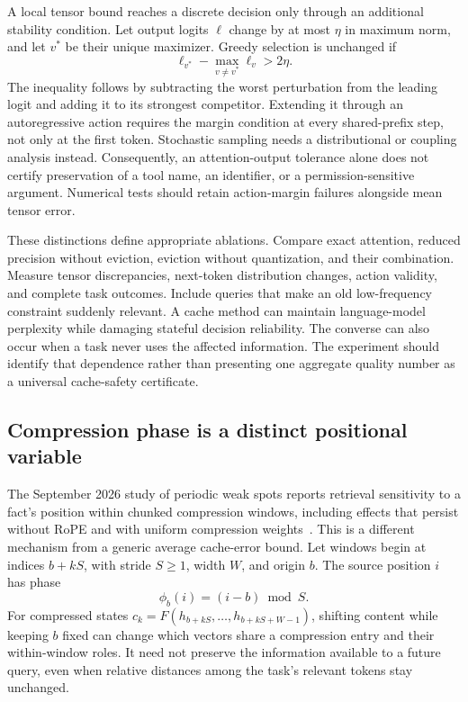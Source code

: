 A local tensor bound reaches a discrete decision only through an additional stability condition. Let output logits $\ell$ change by at most $\eta$ in maximum norm, and let $v^*$ be their unique maximizer. Greedy selection is unchanged if
\begin{equation}
 \ell_{v^*}-\max_{v\ne v^*}\ell_v>2\eta.
\end{equation}
The inequality follows by subtracting the worst perturbation from the leading logit and adding it to its strongest competitor. Extending it through an autoregressive action requires the margin condition at every shared-prefix step, not only at the first token. Stochastic sampling needs a distributional or coupling analysis instead. Consequently, an attention-output tolerance alone does not certify preservation of a tool name, an identifier, or a permission-sensitive argument. Numerical tests should retain action-margin failures alongside mean tensor error.

These distinctions define appropriate ablations. Compare exact attention, reduced precision without eviction, eviction without quantization, and their combination. Measure tensor discrepancies, next-token distribution changes, action validity, and complete task outcomes. Include queries that make an old low-frequency constraint suddenly relevant. A cache method can maintain language-model perplexity while damaging stateful decision reliability. The converse can also occur when a task never uses the affected information. The experiment should identify that dependence rather than presenting one aggregate quality number as a universal cache-safety certificate.

\subsection{Compression phase is a distinct positional variable}
\label{sec:C04:phase}
The September 2026 study of periodic weak spots reports retrieval sensitivity to a fact's position within chunked compression windows, including effects that persist without RoPE and with uniform compression weights~\cite{rewrite_kvphase2026}. This is a different mechanism from a generic average cache-error bound. Let windows begin at indices $b+kS$, with stride $S\geq1$, width $W$, and origin $b$. The source position $i$ has phase
\begin{equation}
 \phi_b(i)=(i-b)\bmod S.
\end{equation}
For compressed states $c_k=F(h_{b+kS},\ldots,h_{b+kS+W-1})$, shifting content while keeping $b$ fixed can change which vectors share a compression entry and their within-window roles. It need not preserve the information available to a future query, even when relative distances among the task's relevant tokens stay unchanged.

